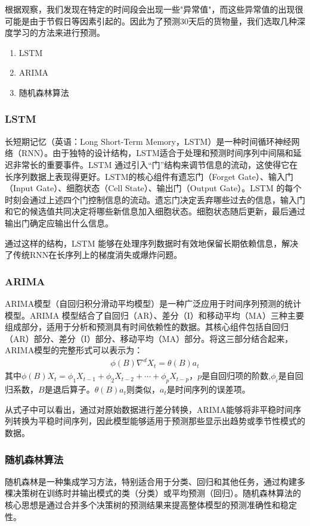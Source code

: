 \documentclass[UTF8]{article}%
\begin{document}
根据观察，我们发现在特定的时间段会出现一些"异常值"，而这些异常值的出现很可能是由于节假日等因素引起的。因此为了预测30天后的货物量，我们选取几种深度学习的方法来进行预测。
\begin{enumerate}
	\item LSTM
	\item ARIMA
	\item 随机森林算法
\end{enumerate}
\subsubsection{LSTM}
长短期记忆（英语：Long Short-Term Memory，LSTM）是一种时间循环神经网络（RNN）。由于独特的设计结构，LSTM适合于处理和预测时间序列中间隔和延迟非常长的重要事件。LSTM 通过引入“门”结构来调节信息的流动，这使得它在长序列数据上表现得更好。LSTM的核心组件有遗忘门（Forget Gate）、输入门（Input Gate）、细胞状态（Cell State）、输出门（Output Gate）。LSTM 的每个时刻会通过上述四个门控制信息的流动。遗忘门决定丢弃哪些过去的信息，输入门和它的候选值共同决定将哪些新信息加入细胞状态。细胞状态随后更新，最后通过输出门确定应输出什么信息。\cite{GRAVES2005602}\cite{6795963}

通过这样的结构，LSTM 能够在处理序列数据时有效地保留长期依赖信息，解决了传统RNN在长序列上的梯度消失或爆炸问题。

\subsubsection{ARIMA}
ARIMA模型（自回归积分滑动平均模型）是一种广泛应用于时间序列预测的统计模型。ARIMA 模型结合了自回归（AR）、差分（I）和移动平均（MA）三种主要组成部分，适用于分析和预测具有时间依赖性的数据。其核心组件包括自回归（AR）部分、差分（I）部分、移动平均（MA）部分。将这三部分结合起来，ARIMA模型的完整形式可以表示为：
\begin{align*}
	\phi (B)\nabla^d X_t = \theta(B)a_t
\end{align*}
其中\(\phi (B) X_t = \phi_1X_{t-1}+\phi_2X_{t-2}+\cdots+\phi_p X_{t-p}\)，$p$是自回归项的阶数,\(\phi_i\)是自回归系数，\(B\)是退后算子。\(\theta(B) 	a_t\)则类似，\(a_t\)是时间序列的误差项。\cite{Newbold1974ExperienceWF}

从式子中可以看出，通过对原始数据进行差分转换，ARIMA能够将非平稳时间序列转换为平稳时间序列，因此模型能够适用于预测那些显示出趋势或季节性模式的数据。
\subsubsection{随机森林算法}
随机森林是一种集成学习方法，特别适合用于分类、回归和其他任务，通过构建多棵决策树在训练时并输出模式的类（分类）或平均预测（回归）。随机森林算法的核心思想是通过合并多个决策树的预测结果来提高整体模型的预测准确性和稳定性。\cite{breiman2001random}
\end{document}
